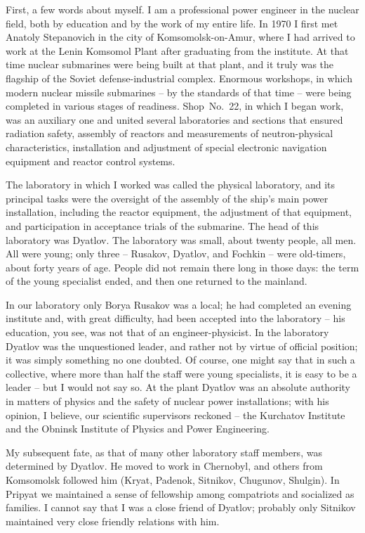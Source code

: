 \documentclass[openright]{bookest}
\begin{document}
First, a few words about myself. I am a professional power engineer in the nuclear field, both by education and by the work of my entire life. In 1970 I first met Anatoly Stepanovich in the city of Komsomolsk-on-Amur, where I had arrived to work at the Lenin Komsomol Plant after graduating from the institute. At that time nuclear submarines were being built at that plant, and it truly was the flagship of the Soviet defense-industrial complex. Enormous workshops, in which modern nuclear missile submarines -- by the standards of that time -- were being completed in various stages of readiness. Shop~No.~22, in which I began work, was an auxiliary one and united several laboratories and sections that ensured radiation safety, assembly of reactors and measurements of neutron-physical characteristics, installation and adjustment of special electronic navigation equipment and reactor control systems.

The laboratory in which I worked was called the physical laboratory, and its principal tasks were the oversight of the assembly of the ship's main power installation, including the reactor equipment, the adjustment of that equipment, and participation in acceptance trials of the submarine. The head of this laboratory was Dyatlov. The laboratory was small, about twenty people, all men. All were young; only three -- Rusakov, Dyatlov, and Fochkin -- were old-timers, about forty years of age. People did not remain there long in those days: the term of the young specialist ended, and then one returned to the mainland.

In our laboratory only Borya Rusakov was a local; he had completed an evening institute and, with great difficulty, had been accepted into the laboratory -- his education, you see, was not that of an engineer-physicist. In the laboratory Dyatlov was the unquestioned leader, and rather not by virtue of official position; it was simply something no one doubted. Of course, one might say that in such a collective, where more than half the staff were young specialists, it is easy to be a leader -- but I would not say so. At the plant Dyatlov was an absolute authority in matters of physics and the safety of nuclear power installations; with his opinion, I believe, our scientific supervisors reckoned -- the Kurchatov Institute and the Obninsk Institute of Physics and Power Engineering.

My subsequent fate, as that of many other laboratory staff members, was determined by Dyatlov. He moved to work in Chernobyl, and others from Komsomolsk followed him (Kryat, Padenok, Sitnikov, Chugunov, Shulgin). In Pripyat we maintained a sense of fellowship among compatriots and socialized as families. I cannot say that I was a close friend of Dyatlov; probably only Sitnikov maintained very close friendly relations with him.
\end{document}
